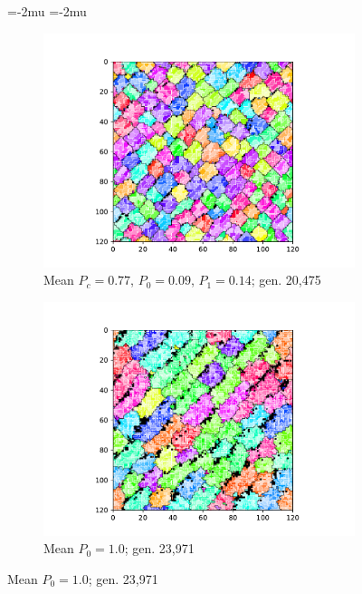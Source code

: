 \begin{figure}[!htbp]
\begin{center}
\thinmuskip=-2mu
\thickmuskip=-2mu
\nulldelimiterspace=-1pt
\scriptspace=0pt
\begin{subfigure}[b]{0.80\columnwidth}
  \includegraphics[width=\columnwidth,trim={2.5cm 0.5cm 2.5cm 1cm},clip]{img/ChannelMap_1022_update19500000}
  \caption{Mean $P_{c} = 0.77$, $P_0 = 0.09$, $P_1 = 0.14$; gen. 20,475}
  \label{fig:ChannelMap_1022}
\end{subfigure}

\begin{subfigure}[b]{0.80\columnwidth}
  \includegraphics[width=\columnwidth,trim={2.5cm 0.5cm 2.5cm 1cm},clip]{img/ChannelMap_1041_update19500000}
  \caption{Mean $P_0 = 1.0$; gen. 23,971}
  \label{fig:ChannelMap_1041}
\end{subfigure}


\end{center}
\end{figure}
